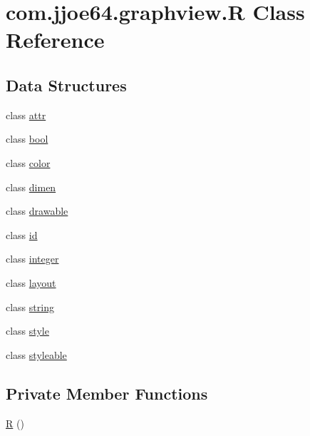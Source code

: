 \hypertarget{classcom_1_1jjoe64_1_1graphview_1_1_r}{}\section{com.\+jjoe64.\+graphview.\+R Class Reference}
\label{classcom_1_1jjoe64_1_1graphview_1_1_r}
\subsection*{Data Structures}
\begin{DoxyCompactItemize}
\item 
class \mbox{\hyperlink{classcom_1_1jjoe64_1_1graphview_1_1_r_1_1attr}{attr}}
\item 
class \mbox{\hyperlink{classcom_1_1jjoe64_1_1graphview_1_1_r_1_1bool}{bool}}
\item 
class \mbox{\hyperlink{classcom_1_1jjoe64_1_1graphview_1_1_r_1_1color}{color}}
\item 
class \mbox{\hyperlink{classcom_1_1jjoe64_1_1graphview_1_1_r_1_1dimen}{dimen}}
\item 
class \mbox{\hyperlink{classcom_1_1jjoe64_1_1graphview_1_1_r_1_1drawable}{drawable}}
\item 
class \mbox{\hyperlink{classcom_1_1jjoe64_1_1graphview_1_1_r_1_1id}{id}}
\item 
class \mbox{\hyperlink{classcom_1_1jjoe64_1_1graphview_1_1_r_1_1integer}{integer}}
\item 
class \mbox{\hyperlink{classcom_1_1jjoe64_1_1graphview_1_1_r_1_1layout}{layout}}
\item 
class \mbox{\hyperlink{classcom_1_1jjoe64_1_1graphview_1_1_r_1_1string}{string}}
\item 
class \mbox{\hyperlink{classcom_1_1jjoe64_1_1graphview_1_1_r_1_1style}{style}}
\item 
class \mbox{\hyperlink{classcom_1_1jjoe64_1_1graphview_1_1_r_1_1styleable}{styleable}}
\end{DoxyCompactItemize}
\subsection*{Private Member Functions}
\begin{DoxyCompactItemize}
\item 
\mbox{\hyperlink{classcom_1_1jjoe64_1_1graphview_1_1_r_a7be993fb9c843ee7caa4549a95ce8d12}{R}} ()
\end{DoxyCompactItemize}



